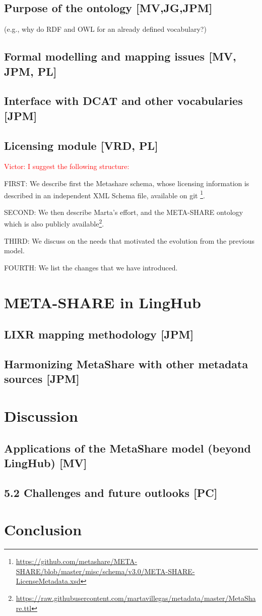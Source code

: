 \documentclass{llncs}
\begin{document}
\subsection{Purpose of the ontology [MV,JG,JPM]}
(e.g., why do RDF and OWL for an already defined vocabulary?) 
\subsection{Formal modelling and mapping issues [MV, JPM, PL]}
\subsection{Interface with DCAT and other vocabularies [JPM]}

\subsection{Licensing module [VRD, PL]}
\textcolor{red}{Victor: I suggest the following structure:}

FIRST: We describe first the Metashare schema, whose licensing information is described in an independent XML Schema file, available on git \footnote{\url{https://github.com/metashare/META-SHARE/blob/master/misc/schema/v3.0/META-SHARE-LicenseMetadata.xsd}}. 

SECOND: We then describe Marta's effort, and the META-SHARE ontology which is also publicly available\footnote{\url{https://raw.githubusercontent.com/martavillegas/metadata/master/MetaShare.ttl}}.

THIRD: We discuss on the needs that motivated the evolution from the previous model. 

FOURTH: We list the changes that we have introduced.


\section{META-SHARE in LingHub}
\subsection{LIXR mapping methodology [JPM]}
\subsection{Harmonizing MetaShare with other metadata sources [JPM]}
\section{Discussion}
\subsection{Applications of the MetaShare model (beyond LingHub) [MV]}
\subsection{5.2 Challenges and future outlooks [PC]}
\section{Conclusion}



\end{document}
